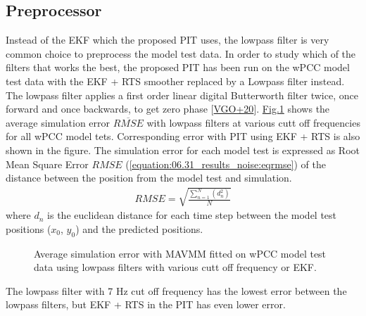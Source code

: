 \documentclass[review]{elsarticle}
\begin{document}
\subsection{Preprocessor}
\label{\detokenize{06.31_results_noise:preprocessor}}\label{\detokenize{06.31_results_noise::doc}}
\sphinxAtStartPar
Instead of the EKF which the proposed PIT uses, the low\sphinxhyphen{}pass filter is very common choice to preprocess the model test data.
In order to study which of the filters that works the best, the proposed PIT has been run on the wPCC model test data with the EKF + RTS smoother replaced by a Low\sphinxhyphen{}pass filter instead. The low\sphinxhyphen{}pass filter applies a first order linear digital Butterworth filter twice, once forward and once backwards, to get zero phase {[}\hyperlink{cite.bibligraphy:id83}{VGO+20}{]}. \hyperref[\detokenize{06.31_results_noise:fig-lowpass-accuracy}]{Fig.\@ \ref{\detokenize{06.31_results_noise:fig-lowpass-accuracy}}} shows the average simulation error \( \overline{RMSE} \) with low\sphinxhyphen{}pass filters at various cutt off frequencies for all wPCC model tets. Corresponding error with PIT using EKF + RTS is also shown in the figure. The simulation error for each model test is expressed as Root Mean Square Error \(RMSE\) (\autoref{equation:06.31_results_noise:eqrmse}) of the distance between the position from the model test and simulation.
\begin{equation}\label{equation:06.31_results_noise:eqrmse}
\begin{split}RMSE=\sqrt{ \frac{\sum_{n=1}^{N} (d_n^2) }{N}} \end{split}
\end{equation}
\sphinxAtStartPar
where \(d_n\) is the euclidean distance for each time step between the model test positions (\(x_0\), \(y_0\)) and the predicted positions.

\begin{figure}[H]
\centering
\capstart

\noindent{}
\caption{Average simulation error with MAVMM fitted on wPCC model test data using low\sphinxhyphen{}pass filters with various cutt off frequency or EKF.}\label{\detokenize{06.31_results_noise:fig-lowpass-accuracy}}\end{figure}

\sphinxAtStartPar
The low\sphinxhyphen{}pass filter with 7 Hz cut off frequency has the lowest error between the low\sphinxhyphen{}pass filters, but EKF + RTS in the PIT has even lower error.
\end{document}
